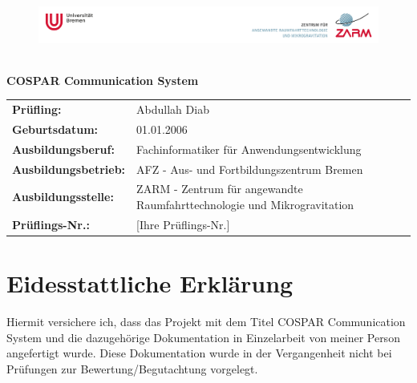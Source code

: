 \documentclass[11pt,a4paper]{article}
\begin{document}
\thispagestyle{empty}

\begin{figure}[H]
    \hspace*{-2.0cm}\vspace*{2cm}\includegraphics[height=2.2cm]{image1.png}
\end{figure}

\vspace{3cm}

\begin{center}
    {\Huge \textbf{COSPAR Communication System}}
\end{center}

\vfill

\begin{center}
    \begin{tabular}{ll}
        \textbf{Prüfling:} & Abdullah Diab \\[0.5em]
        \textbf{Geburtsdatum:} & 01.01.2006 \\[0.5em]
        \textbf{Ausbildungsberuf:} & Fachinformatiker für Anwendungsentwicklung \\[0.5em]
        \textbf{Ausbildungsbetrieb:} & AFZ - Aus- und Fortbildungszentrum Bremen \\[0.5em]
        \textbf{Ausbildungsstelle:} & ZARM - Zentrum für angewandte Raumfahrttechnologie und Mikrogravitation \\[0.5em]
        \textbf{Prüflings-Nr.:} & [Ihre Prüflings-Nr.] \\
    \end{tabular}
\end{center}

\vspace{2cm}

\newpage

\section*{Eidesstattliche Erklärung}
\thispagestyle{empty}

Hiermit versichere ich, dass das Projekt mit dem Titel \glqq COSPAR Communication System\grqq{} und die dazugehörige Dokumentation in Einzelarbeit von meiner Person angefertigt wurde. Diese Dokumentation wurde in der Vergangenheit nicht bei Prüfungen zur Bewertung/Begutachtung vorgelegt.
\end{document}
